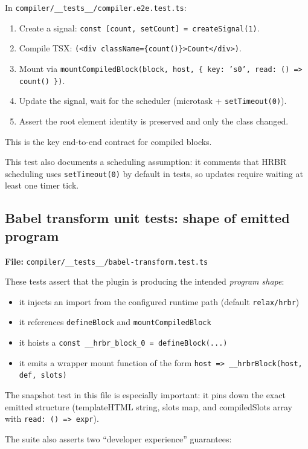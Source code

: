 In \texttt{compiler/\_\_tests\_\_/compiler.e2e.test.ts}:

\begin{enumerate}
\item Create a signal: \texttt{const [count, setCount] = createSignal(1)}.
\item Compile TSX: \texttt{(<div className=\{count()\}>Count</div>)}.
\item Mount via \texttt{mountCompiledBlock(block, host, \{ key: 's0', read: () => count() \})}.
\item Update the signal, wait for the scheduler (microtask + \texttt{setTimeout(0)}).
\item Assert the root element identity is preserved and only the class changed.
\end{enumerate}

This is the key end-to-end contract for compiled blocks.

This test also documents a scheduling assumption: it comments that HRBR scheduling uses \texttt{setTimeout(0)} by default in tests, so updates require waiting at least one timer tick.

\subsection{Babel transform unit tests: shape of emitted program}


	\textbf{File:} \texttt{compiler/\_\_tests\_\_/babel-transform.test.ts}

These tests assert that the plugin is producing the intended \emph{program shape}:

\begin{itemize}
\item it injects an import from the configured runtime path (default \texttt{relax/hrbr})
\item it references \texttt{defineBlock} and \texttt{mountCompiledBlock}
\item it hoists a \texttt{const \_\_hrbr\_block\_0 = defineBlock(...)}
\item it emits a wrapper mount function of the form \texttt{host => \_\_hrbrBlock(host, def, slots)}
\end{itemize}

The snapshot test in this file is especially important: it pins down the exact emitted structure (templateHTML string, slots map, and compiledSlots array with \texttt{read: () => expr}).

The suite also asserts two ``developer experience'' guarantees:

